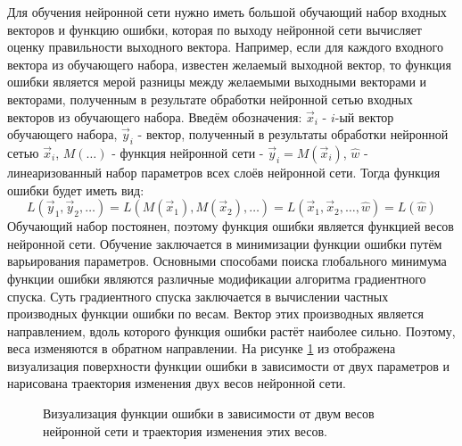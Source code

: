 \par
Для обучения нейронной сети нужно иметь большой обучающий набор входных векторов и функцию ошибки, которая по выходу нейронной сети вычисляет оценку правильности выходного вектора. Например, если для каждого входного вектора из обучающего набора, известен желаемый выходной вектор, то функция ошибки является мерой разницы между желаемыми выходными векторами и векторами, полученным в результате обработки нейронной сетью входных векторов из обучающего набора. Введём обозначения: $\vec{x}_i$ - $i$-ый вектор обучающего набора, $\vec{y}_i$ - вектор, полученный в результаты обработки нейронной сетью $\vec{x}_i$, $M(\dots)$ - функция нейронной сети - $\vec{y}_i=M(\vec{x}_i)$, $\hat{w}$ - линеаризованный набор параметров всех слоёв нейронной сети. Тогда функция ошибки будет иметь вид:
\begin{equation}\label{eq:loss1}
	L\left(\vec{y}_1,\vec{y}_2,\dots\right) = L\left(M(\vec{x}_1),M(\vec{x}_2),\dots\right) = L(\vec{x}_1,\vec{x}_2,\dots,\hat{w}) = L(\hat{w})
\end{equation}
Обучающий набор постоянен, поэтому функция ошибки является функцией весов нейронной сети. Обучение заключается в минимизации функции ошибки путём варьирования параметров. Основными способами поиска глобального минимума функции ошибки являются различные модификации алгоритма градиентного спуска. Суть градиентного спуска заключается в вычислении частных производных функции ошибки по весам. Вектор этих производных является направлением, вдоль которого функция ошибки растёт наиболее сильно. Поэтому, веса изменяются в обратном направлении. На рисунке \ref{ris:SGD} из \cite{amini2018spatial} отображена визуализация поверхности функции ошибки в зависимости от двух параметров и нарисована траектория изменения двух весов нейронной сети.
\begin{figure}[h]
	\caption{Визуализация функции ошибки в зависимости от двум весов нейронной сети и траектория изменения этих весов.}
	\label{ris:SGD}
\end{figure}
